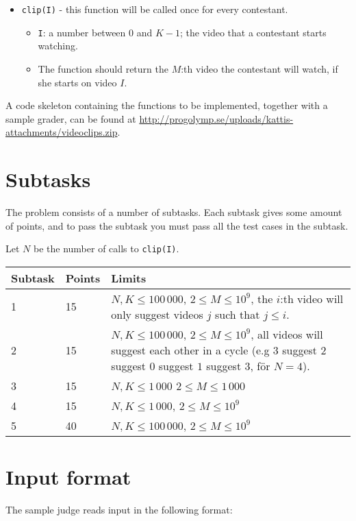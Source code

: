 \begin{itemize}
  \item \texttt{clip(I)} - this function will be called once for every contestant.
  \begin{itemize}
    \item \texttt{I}: a number between $0$ and $K - 1$; the video that a contestant starts watching.
		\item The function should return the $M$:th video the contestant will watch, if she starts on video $I$.
  \end{itemize}
\end{itemize}

A code skeleton containing the functions to be implemented, together with a sample grader, can be found at
\url{http://progolymp.se/uploads/kattis-attachments/videoclips.zip}.

\section*{Subtasks}
The problem consists of a number of subtasks. Each subtask gives some amount of points, and to pass
the subtask you must pass all the test cases in the subtask.

Let $N$ be the number of calls to \texttt{clip(I)}.

\begin{tabular}{|l|l|p{7cm}|}
  \hline
  \textbf{Subtask} & \textbf{Points} & \textbf{Limits} \\ \hline
  1 & 15 & $N, K \le 100\,000$, $2 \le M \le 10^9$, the $i$:th video will only suggest videos $j$ such that $j \le i$. \\ \hline
  2 & 15 & $N, K \le 100\,000$, $2 \le M \le 10^9$, all videos will suggest each other in a cycle (e.g $3$ suggest $2$ suggest $0$ suggest $1$ suggest $3$, för $N = 4$). \\ \hline
  3 & 15 & $N, K \le 1\,000$ $2 \le M \le 1\,000$ \\ \hline
  4 & 15 & $N, K \le 1\,000$, $2 \le M \le 10^9$ \\ \hline
  5 & 40 & $N, K \le 100\,000$, $2 \le M \le 10^9$ \\ \hline
\end{tabular}

\section*{Input format}
The sample judge reads input in the following format:


